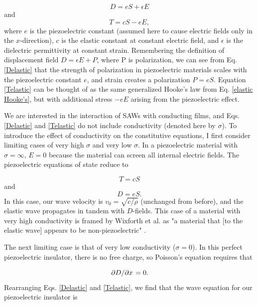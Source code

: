 \documentclass[double,12pt,1in]{beavtex}
\begin{document}
\begin{equation} 
    D = eS + \epsilon E \label{Delastic}
\end{equation}
and
\begin{equation} 
    T = cS -eE, \label{Telastic}
\end{equation}
where $e$ is the piezoelectric constant (assumed here to cause electric fields only in the $x$-direction), $c$ is the elastic constant at constant electric field, and $\epsilon$ is the dielectric permittivity at constant strain. Remembering the definition of displacement field $D = \epsilon E + P$, where P is polarization, we can see from Eq. \ref{Delastic} that the strength of polarization in piezoelectric materials scales with the piezoelectric constant $e$, and strain creates a polarization $P = eS$. Equation \ref{Telastic} can be thought of as the same generalized Hooke's law from Eq. \ref{elastic Hooke's}, but with additional stress $-eE$ arising from the piezoelectric effect. 

We are interested in the interaction of SAWs with conducting films, and Eqs. \ref{Delastic} and \ref{Telastic} do not include conductivity (denoted here by $\sigma$). To introduce the effect of conductivity on the constitutive equations, I first consider limiting cases of very high $\sigma$ and very low $\sigma$. In a piezoelectric material with $\sigma = \infty$, $E = 0$ because the material can screen all internal electric fields. The piezoelectric equations of state reduce to 

\begin{equation}
    T = cS
\end{equation}
and
\begin{equation}
    D = eS.
\end{equation}
In this case, our wave velocity is $v_0 = \sqrt{c/\rho}$ (unchanged from before), and the elastic wave propagates in tandem with $D$-fields. This case of a material with very high conductivity is framed by Wixforth et al. as "a material that [to the elastic wave] appears to be non-piezoelectric" \cite{wixforth_surface_1989}.

The next limiting case is that of very low conductivity ($\sigma = 0$). In this perfect piezoelectric insulator, there is no free charge, so Poisson's equation requires that 

\begin{equation}
    \pdv*{D}{x} = 0.
\end{equation}
Rearranging Eqs. \ref{Delastic} and \ref{Telastic}, we find that the wave equation for our piezoelectric insulator is
\end{document}
